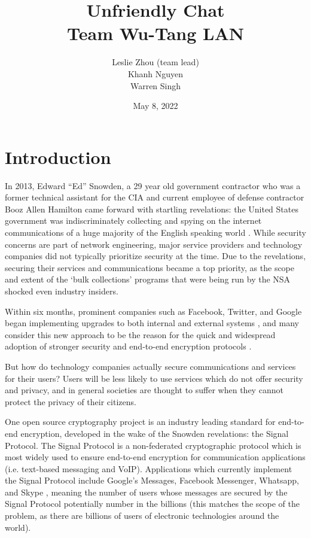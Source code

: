 \documentclass[12pt]{article}
\title{%
    Unfriendly Chat\\
    \large Team Wu-Tang LAN}
\author{Leslie Zhou (team lead)\\ Khanh Nguyen \\ Warren Singh}
\date{May 8, 2022}
\begin{document}
\maketitle

\newpage
\tableofcontents
\newpage

\section{Introduction}
In 2013, Edward “Ed” Snowden, a 29 year old government contractor who was a former technical assistant for the CIA and current employee of defense contractor Booz Allen Hamilton came forward with startling revelations: the United States government was indiscriminately collecting and spying on the internet communications of a huge majority of the English speaking world \parencite{website:snowden}. While security concerns are part of network engineering, major service providers and technology companies did not typically prioritize security at the time. Due to the revelations, securing their services and communications became a top priority, as the scope and extent of the ‘bulk collections’ programs that were being run by the NSA shocked even industry insiders.
\par Within six months, prominent companies such as Facebook, Twitter, and Google began implementing upgrades to both internal and external systems \parencite{website:nytimes}, and many consider this new approach to be the reason for the quick and widespread adoption of stronger security and end-to-end encryption protocols \parencite{website:newsweek}. 

\par %
But how do technology companies actually secure communications and services for their users? Users will be less likely to use services which do not offer security and privacy, and in general societies are thought to suffer when they cannot protect the privacy of their citizens. 
\par One open source cryptography project \parencite{website:open-source} is an industry leading standard \parencite{website:signal-widespread} for end-to-end encryption, developed in the wake of the Snowden revelations: the Signal Protocol. The Signal Protocol \parencite{website:signal-docs} is a non-federated cryptographic protocol which is most widely used to ensure end-to-end encryption for communication applications (i.e. text-based messaging and VoIP). Applications which currently implement the Signal Protocol include Google’s Messages, Facebook Messenger, Whatsapp, and Skype \parencite{website:signal-widespread}, meaning the number of users whose messages are secured by the Signal Protocol potentially number in the billions (this matches the scope of the problem, as there are billions of users of electronic technologies around the world).
\end{document}
